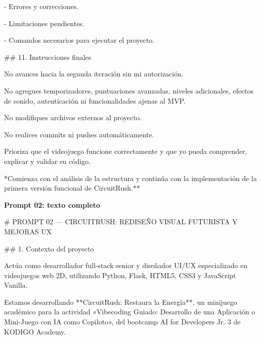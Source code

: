 \noindent - Errores y correcciones.\par
\noindent - Limitaciones pendientes.\par
\noindent - Comandos necesarios para ejecutar el proyecto.\par
\par\smallskip
\noindent \#\# 11. Instrucciones finales\par
\par\smallskip
\noindent No avances hacia la segunda iteración sin mi autorización.\par
\par\smallskip
\noindent No agregues temporizadores, puntuaciones avanzadas, niveles adicionales, efectos de sonido, autenticación ni funcionalidades ajenas al MVP.\par
\par\smallskip
\noindent No modifiques archivos externos al proyecto.\par
\par\smallskip
\noindent No realices commits ni pushes automáticamente.\par
\par\smallskip
\noindent Prioriza que el videojuego funcione correctamente y que yo pueda comprender, explicar y validar su código.\par
\par\smallskip
\noindent **Comienza con el análisis de la estructura y continúa con la implementación de la primera versión funcional de CircuitRush.**\par
\clearpage
{}
\label{prompt:02}
{\sffamily\large\bfseries Prompt 02: texto completo\par}
\medskip
\noindent \# PROMPT 02 — CIRCUITRUSH: REDISEÑO VISUAL FUTURISTA Y MEJORAS UX\par
\par\smallskip
\noindent \#\# 1. Contexto del proyecto\par
\par\smallskip
\noindent Actúa como desarrollador full-stack senior y diseñador UI/UX especializado en videojuegos web 2D, utilizando Python, Flask, HTML5, CSS3 y JavaScript Vanilla.\par
\par\smallskip
\noindent Estamos desarrollando **CircuitRush: Restaura la Energía**, un minijuego académico para la actividad «Vibecoding Guiado: Desarrollo de una Aplicación o Mini-Juego con IA como Copiloto», del bootcamp AI for Developers Jr. 3 de KODIGO Academy.\par
